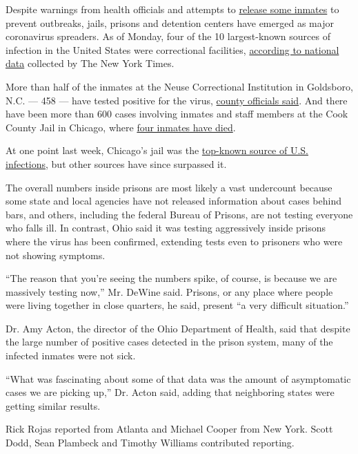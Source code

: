 Despite warnings from health officials and attempts to
\href{https://www.nytimes.com/2020/03/30/us/coronavirus-prisons-jails.html}{release
some inmates} to prevent outbreaks, jails, prisons and detention centers
have emerged as major coronavirus spreaders. As of Monday, four of the
10 largest-known sources of infection in the United States were
correctional facilities,
\href{https://www.nytimes.com/interactive/2020/us/coronavirus-us-cases.html}{according
to national data} collected by The New York Times.

More than half of the inmates at the Neuse Correctional Institution in
Goldsboro, N.C. --- 458 --- have tested positive for the virus,
\href{https://www.waynegov.com/946/Coronavirus-COVID-19}{county
officials said}. And there have been more than 600 cases involving
inmates and staff members at the Cook County Jail in Chicago, where
\href{https://www.chicagotribune.com/news/breaking/ct-4th-ccj-covid19-death-20200420-fwwoavnzrzfznnymlebyq2umwi-story.html}{four
inmates have died}.

At one point last week, Chicago's jail was the
\href{https://www.nytimes.com/2020/04/08/us/coronavirus-cook-county-jail-chicago.html}{top-known
source of U.S. infections}, but other sources have since surpassed it.

The overall numbers inside prisons are most likely a vast undercount
because some state and local agencies have not released information
about cases behind bars, and others, including the federal Bureau of
Prisons, are not testing everyone who falls ill. In contrast, Ohio said
it was testing aggressively inside prisons where the virus has been
confirmed, extending tests even to prisoners who were not showing
symptoms.

``The reason that you're seeing the numbers spike, of course, is because
we are massively testing now,'' Mr. DeWine said. Prisons, or any place
where people were living together in close quarters, he said, present
``a very difficult situation.''

Dr. Amy Acton, the director of the Ohio Department of Health, said that
despite the large number of positive cases detected in the prison
system, many of the infected inmates were not sick.

``What was fascinating about some of that data was the amount of
asymptomatic cases we are picking up,'' Dr. Acton said, adding that
neighboring states were getting similar results.

Rick Rojas reported from Atlanta and Michael Cooper from New York. Scott
Dodd, Sean Plambeck and Timothy Williams contributed reporting.

